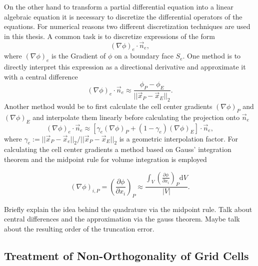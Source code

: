     On the other hand to transform a partial differential equation into a linear algebraic equation it is necessary to discretize the differential operators of the equations. For numerical reasons two different discretization techniques are used in this thesis. A common task is to discretize expressions of the form
    \begin{displaymath}
      \left(\nabla \phi\right)_e \cdot \vec{n}_e,
    \end{displaymath}
    where \(\left(\nabla \phi\right)_e\) is the Gradient of \(\phi\) on a boundary face \(S_e\). One method is to directly interpret this expression as a directional derivative and approximate it with a central difference
    \begin{equation}
      \label{eq:cds}
      \left(\nabla \phi\right)_e \cdot \vec{n}_e \approx \frac{\phi_P - \phi_E}{|| \vec{x}_P - \vec{x}_E ||_2}.
    \end{equation}
    Another method would be to first calculate the cell center gradients \(\left(\nabla \phi \right)_P\) and \(\left(\nabla \phi \right)_E\) and interpolate them linearly before calculating the projection onto \(\vec{n}_e\)
    \begin{equation}
      \label{eq:interpolgrad}
      \left(\nabla \phi\right)_e \cdot \vec{n}_e 
      \approx 
      \left[\gamma_e \left(\nabla \phi \right)_P + (1-\gamma_e) \left(\nabla \phi \right)_E \right] \cdot \vec{n}_e,
    \end{equation}
    where \( \gamma_e := {||\vec{x}_P - \vec{x}_e||_2}/{||\vec{x}_P - \vec{x}_E||_2}\) is a geometric interpolation factor. For calculating the cell center gradients a method based on Gauss' integration theorem and the midpoint rule for volume integration is employed

    \begin{equation}
      \label{eq:gaussgrad}
      \left( \nabla \phi \right)_{i,P}
      =
      \left( \frac{\partial \phi}{\partial x_i}\right)_P
      \approx
      \frac{\int_V\left(\frac{\partial \phi}{\partial x_i}\right)_P\mathrm{d}V}{|V|}.
    \end{equation}

    Briefly explain the idea behind the quadrature via the midpoint rule. Talk about central differences and the approximation via the gauss theorem. Maybe talk about the resulting order of the truncation error. 

    \subsection{Treatment of Non-Orthogonality of Grid Cells}
    \label{sec:nonorth}

